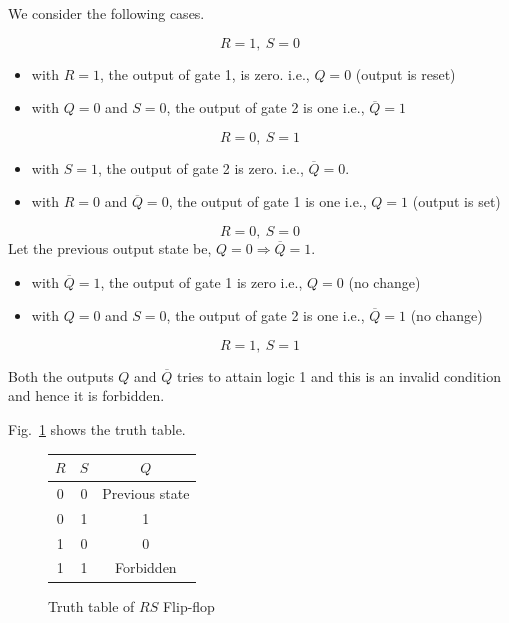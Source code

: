 \eject

We consider the following cases.

$$
R=1, \ S=0
$$
\begin{itemize}
\item with $R=1$, the output of gate 1, is zero. i.e., $Q=0$ (output is reset)

\item with $Q=0$ and $S=0$, the output of gate 2 is one i.e., $\overline{Q}=1$
\end{itemize}

$$
R=0, \ S=1
$$
\begin{itemize}
\item with $S=1$, the output of gate 2 is zero. i.e., $\overline{Q}=0$.

\item with $R=0$ and $\overline{Q}=0$, the output of gate 1 is one i.e., $Q=1$ (output is set)
\end{itemize}

$$
R=0, \ S=0
$$
Let the previous output state be, $Q=0\Rightarrow \overline{Q}=1$.
\begin{itemize}
\item with $\overline{Q}=1$, the output of gate 1 is zero i.e., $Q=0$ (no change)

\item with $Q=0$ and $S=0$, the output of gate 2 is one i.e., $\overline{Q}=1$ (no change)
\end{itemize}

$$
R=1, \ S=1
$$

Both the outputs $Q$ and $\overline{Q}$ tries to attain logic 1 and this is an invalid condition and hence it is forbidden.

Fig.~\ref{fig6.40} shows the truth table.
\begin{figure}[H]
\centering
\tabcolsep=15pt
\renewcommand{\arraystretch}{1.2}
\begin{tabular}{|c|c|c|}
\hline
\boldmath$R$ & \boldmath$S$ & \boldmath$Q$\\
\hline
0 & 0 & Previous state\\
0 & 1 & 1\\
1 & 0 & 0\\
1 & 1 & Forbidden\\
\hline
\end{tabular}
\caption{Truth table of $RS$ Flip-flop}\label{fig6.40}
\end{figure}

